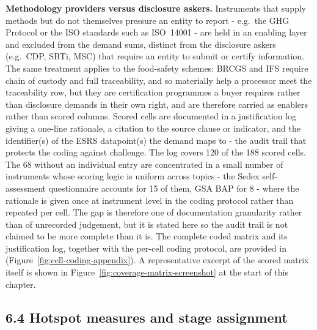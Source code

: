 \textbf{Methodology providers versus disclosure askers.} Instruments that supply
methods but do not themselves pressure an entity to report - e.g.\ the GHG
Protocol or the ISO standards such as ISO~14001 - are held in an enabling layer
and excluded from the demand sums, distinct from the disclosure askers (e.g.\
CDP, SBTi, MSC) that require an entity to submit or certify information. The
same treatment applies to the food-safety schemes: BRCGS and IFS require chain
of custody and full traceability, and so materially help a processor meet the
traceability row, but they are certification programmes a buyer requires rather
than disclosure demands in their own right, and are therefore carried as
enablers rather than scored columns. Scored cells are documented in a
justification log giving a one-line rationale, a citation to the source clause or
indicator, and the identifier(s) of the ESRS datapoint(s) the demand maps to -
the audit trail that protects the coding against challenge. The log covers 120 of
the 188 scored cells. The 68 without an individual entry are concentrated in a
small number of instruments whose scoring logic is uniform across topics - the
Sedex self-assessment questionnaire accounts for 15 of them, GSA BAP for 8 - where
the rationale is given once at instrument level in the coding protocol rather than
repeated per cell. The gap is therefore one of documentation granularity rather
than of unrecorded judgement, but it is stated here so the audit trail is not
claimed to be more complete than it is. The complete coded
matrix and its justification log, together with the per-cell coding protocol,
are provided in \nameref{app:matrix} (Figure~\ref{fig:cell-coding-appendix}). A
representative excerpt of the scored matrix itself is shown in
Figure~\ref{fig:coverage-matrix-screenshot} at the start of this chapter.

\FloatBarrier
\subsection{6.4 Hotspot measures and stage
assignment}\label{cm-staging}

